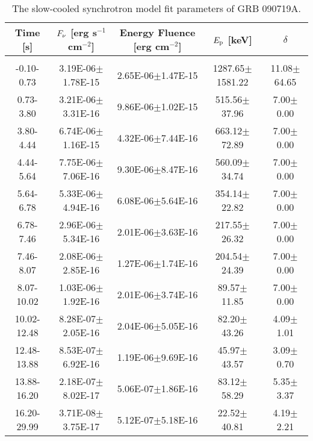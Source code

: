 \begin{table}[h]
\centering
\scriptsize
\label{tab:}
\begin{tabular}{c| c c c c}
Time [s] & $F_{\nu}$ [erg s$^{-1}$ cm$^{-2}$] & Energy Fluence [erg cm$^{-2}$] & $E_{\rm p}$ [keV] & $\delta$ \\
\hline \hline\\ 

-0.10-0.73 & 3.19E-06$\pm$1.78E-15 & 2.65E-06$\pm$1.47E-15 & 1287.65$\pm$1581.22 & 11.08$\pm$64.65 \\ 

0.73-3.80 & 3.21E-06$\pm$3.31E-16 & 9.86E-06$\pm$1.02E-15 & 515.56$\pm$37.96 & 7.00$\pm$0.00 \\ 

3.80-4.44 & 6.74E-06$\pm$1.16E-15 & 4.32E-06$\pm$7.44E-16 & 663.12$\pm$72.89 & 7.00$\pm$0.00 \\ 

4.44-5.64 & 7.75E-06$\pm$7.06E-16 & 9.30E-06$\pm$8.47E-16 & 560.09$\pm$34.74 & 7.00$\pm$0.00 \\ 

5.64-6.78 & 5.33E-06$\pm$4.94E-16 & 6.08E-06$\pm$5.64E-16 & 354.14$\pm$22.82 & 7.00$\pm$0.00 \\ 

6.78-7.46 & 2.96E-06$\pm$5.34E-16 & 2.01E-06$\pm$3.63E-16 & 217.55$\pm$26.32 & 7.00$\pm$0.00 \\ 

7.46-8.07 & 2.08E-06$\pm$2.85E-16 & 1.27E-06$\pm$1.74E-16 & 204.54$\pm$24.39 & 7.00$\pm$0.00 \\ 

8.07-10.02 & 1.03E-06$\pm$1.92E-16 & 2.01E-06$\pm$3.74E-16 & 89.57$\pm$11.85 & 7.00$\pm$0.00 \\ 

10.02-12.48 & 8.28E-07$\pm$2.05E-16 & 2.04E-06$\pm$5.05E-16 & 82.20$\pm$43.26 & 4.09$\pm$1.01 \\ 

12.48-13.88 & 8.53E-07$\pm$6.92E-16 & 1.19E-06$\pm$9.69E-16 & 45.97$\pm$43.57 & 3.09$\pm$0.70 \\ 

13.88-16.20 & 2.18E-07$\pm$8.02E-17 & 5.06E-07$\pm$1.86E-16 & 83.12$\pm$58.29 & 5.35$\pm$3.37 \\ 

16.20-29.99 & 3.71E-08$\pm$3.75E-17 & 5.12E-07$\pm$5.18E-16 & 22.52$\pm$40.81 & 4.19$\pm$2.21 \\ 

\end{tabular}
\caption{The slow-cooled synchrotron model fit parameters of GRB 090719A.}
\end{table}


